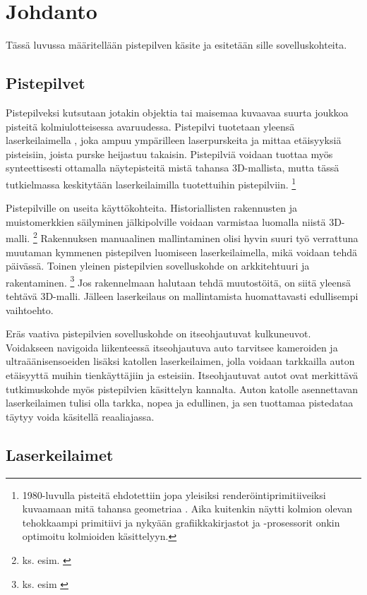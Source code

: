 \section{Johdanto}
Tässä luvussa määritellään pistepilven käsite ja esitetään sille sovelluskohteita.


\subsection{Pistepilvet}

Pistepilveksi kutsutaan jotakin objektia tai maisemaa kuvaavaa suurta joukkoa pisteitä kolmiulotteisessa avaruudessa. Pistepilvi tuotetaan yleensä laserkeilaimella , joka ampuu ympärilleen laserpurskeita ja mittaa etäisyyksiä pisteisiin, joista purske heijastuu takaisin. Pistepilviä voidaan tuottaa myös synteettisesti ottamalla näytepisteitä mistä tahansa 3D-mallista, mutta tässä tutkielmassa keskitytään laserkeilaimilla tuotettuihin pistepilviin. \footnote{1980-luvulla pisteitä ehdotettiin jopa yleisiksi renderöintiprimitiiveiksi kuvaamaan mitä tahansa geometriaa \cite{Whitted}. Aika kuitenkin näytti kolmion olevan tehokkaampi primitiivi ja nykyään grafiikkakirjastot ja -prosessorit onkin optimoitu kolmioiden käsittelyyn.}

Pistepilville on useita käyttökohteita. Historiallisten rakennusten ja muistomerkkien säilyminen jälkipolville voidaan varmistaa luomalla niistä 3D-malli. \footnote{ks. esim. \cite{Kersten}} Rakennuksen manuaalinen mallintaminen olisi hyvin suuri työ verrattuna muutaman kymmenen pistepilven luomiseen laserkeilaimella, mikä voidaan tehdä päivässä. Toinen yleinen pistepilvien sovelluskohde on arkkitehtuuri ja rakentaminen. \footnote{ks. esim \cite{silta}} Jos rakennelmaan halutaan tehdä muutostöitä, on siitä yleensä tehtävä 3D-malli. Jälleen laserkeilaus on mallintamista huomattavasti edullisempi vaihtoehto.

Eräs vaativa pistepilvien sovelluskohde on itseohjautuvat kulkuneuvot. Voidakseen navigoida liikenteessä itseohjautuva auto tarvitsee kameroiden ja ultraäänisensoeiden lisäksi katollen laserkeilaimen, jolla voidaan tarkkailla auton etäisyyttä muihin tienkäyttäjiin ja esteisiin. Itseohjautuvat autot ovat merkittävä tutkimuskohde myös pistepilvien käsittelyn kannalta. Auton katolle asennettavan laserkeilaimen tulisi olla tarkka, nopea ja edullinen, ja sen tuottamaa pistedataa täytyy voida käsitellä reaaliajassa. \cite{car} 

\subsection{Laserkeilaimet}

